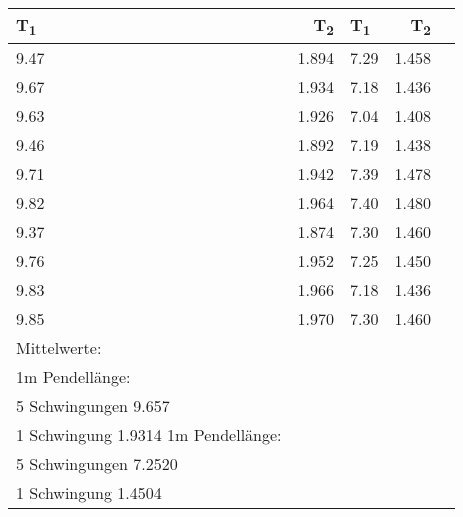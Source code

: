 \documentclass[titlepage=firstcover, captions=tableheading]{scrartcl}
\begin{document}
\begin{center}
    \begin{tabular}{lrlrr}
        \toprule
        {T\textsubscript{1}} & {T\textsubscript{2}} & {T\textsubscript{1}} & {T\textsubscript{2}} \\
        \midrule
        9.47 & 1.894 & 7.29 & 1.458 \\
        9.67 & 1.934 & 7.18 & 1.436 \\
        9.63 & 1.926 & 7.04 & 1.408 \\
        9.46 & 1.892 & 7.19 & 1.438 \\
        9.71 & 1.942 & 7.39 & 1.478 \\
        9.82 & 1.964 & 7.40 & 1.480 \\
        9.37 & 1.874 & 7.30 & 1.460 \\
        9.76 & 1.952 & 7.25 & 1.450 \\
        9.83 & 1.966 & 7.18 & 1.436 \\
        9.85 & 1.970 & 7.30 & 1.460 \\
        \midrule
        Mittelwerte:\\
        1m Pendellänge:\\
        5 Schwingungen 9.657\\
        1 Schwingung 1.9314
        1m Pendellänge:\\
        5 Schwingungen 7.2520\\
        1 Schwingung 1.4504\\
        \bottomrule
        
    \end{tabular}
\end{center}
\end{document}
